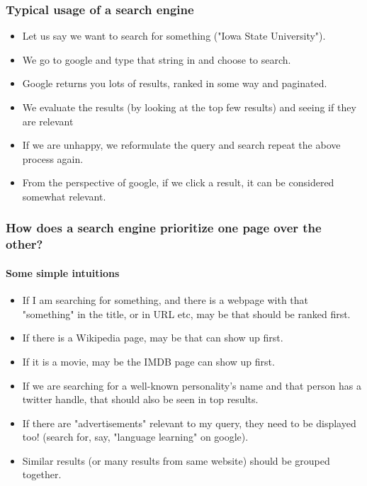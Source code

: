 \documentclass{beamer}
\begin{document}
\begin{frame}
\frametitle{Typical usage of a search engine}
\begin{itemize}
\item Let us say we want to search for something ("Iowa State University").
\item We go to google and type that string in and choose to search.
\item Google returns you lots of results, ranked in some way and paginated.
\item We evaluate the results (by looking at the top few results) and seeing if they are relevant \pause
\item If we are unhappy, we reformulate the query and search repeat the above process again. \pause
\item From the perspective of google, if we click a result, it can be considered somewhat relevant. 
\end{itemize}
\end{frame}

\begin{frame}
\frametitle{How does a search engine prioritize one page over the other?}
\framesubtitle{Some simple intuitions}
\begin{itemize}
\item If I am searching for something, and there is a webpage with that "something" in the title, or in URL etc, may be that should be ranked first.
\item If there is a Wikipedia page, may be that can show up first.
\item If it is a movie, may be the IMDB page can show up first.
\item If we are searching for a well-known personality's name and that person has a twitter handle, that should also be seen in top results.
\item If there are "advertisements" relevant to my query, they need to be displayed too! (search for, say, "language learning" on google). 
\item Similar results (or many results from same website) should be grouped together.
\end{itemize}
\end{frame}
\end{document}
